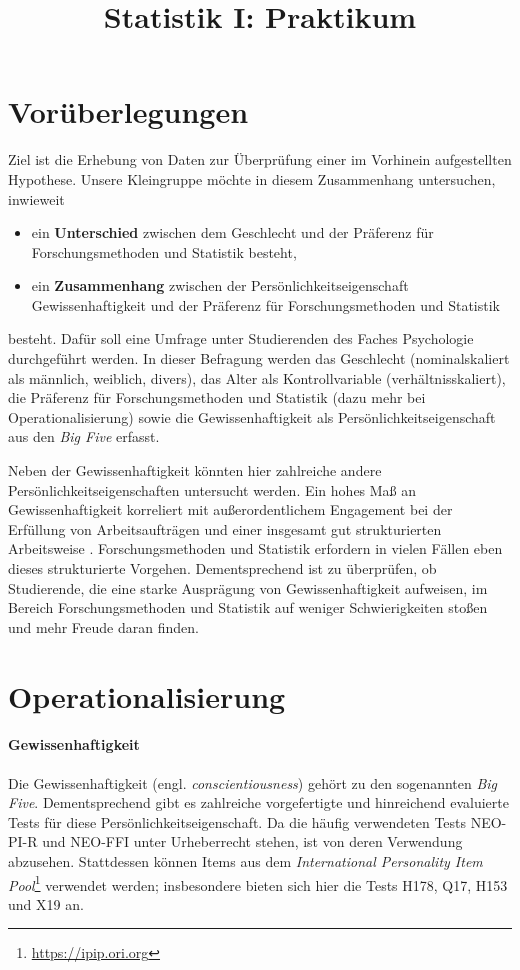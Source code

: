 \documentclass[doc]{apa7}
\title{Statistik I: Praktikum}
\begin{document}
\maketitle

\section{Vorüberlegungen}
\noindent Ziel ist die Erhebung von Daten zur Überprüfung einer im Vorhinein aufgestellten Hypothese. Unsere Kleingruppe möchte in diesem Zusammenhang untersuchen, inwieweit
\begin{itemize}
    \item ein \textbf{Unterschied} zwischen dem Geschlecht und der Präferenz für Forschungsmethoden und Statistik besteht,
    \item ein \textbf{Zusammenhang} zwischen der Persönlichkeitseigenschaft Gewissenhaftigkeit und der Präferenz für Forschungsmethoden und Statistik
\end{itemize}
besteht. Dafür soll eine Umfrage unter Studierenden des Faches Psychologie durchgeführt werden. In dieser Befragung werden das Geschlecht (nominalskaliert als männlich, weiblich, divers), das Alter als Kontrollvariable (verhältnisskaliert), die Präferenz für Forschungsmethoden und Statistik (dazu mehr bei Operationalisierung) sowie die Gewissenhaftigkeit als Persönlichkeitseigenschaft aus den \textit{Big Five} erfasst. \newline

\noindent Neben der Gewissenhaftigkeit könnten hier zahlreiche andere Persönlichkeitseigenschaften untersucht werden. Ein hohes Maß an Gewissenhaftigkeit korreliert mit außerordentlichem Engagement bei der Erfüllung von Arbeitsaufträgen und einer insgesamt gut strukturierten Arbeitsweise \autocite{jackson_what_2010}. Forschungsmethoden und Statistik erfordern in vielen Fällen eben dieses strukturierte Vorgehen. Dementsprechend ist zu überprüfen, ob Studierende, die eine starke Ausprägung von Gewissenhaftigkeit aufweisen, im Bereich Forschungsmethoden und Statistik auf weniger Schwierigkeiten stoßen und mehr Freude daran finden.


\section{Operationalisierung}
\paragraph{Gewissenhaftigkeit} Die Gewissenhaftigkeit (engl. \textit{conscientiousness}) gehört zu den sogenannten \textit{Big Five}. Dementsprechend gibt es zahlreiche vorgefertigte und hinreichend evaluierte Tests für diese Persönlichkeitseigenschaft. Da die häufig verwendeten Tests NEO-PI-R und NEO-FFI unter Urheberrecht stehen, ist von deren Verwendung abzusehen. Stattdessen können Items aus dem \textit{International Personality Item Pool}\footnote{\url{https://ipip.ori.org}} verwendet werden; insbesondere bieten sich hier die Tests H178, Q17, H153 und X19 an.
\end{document}
